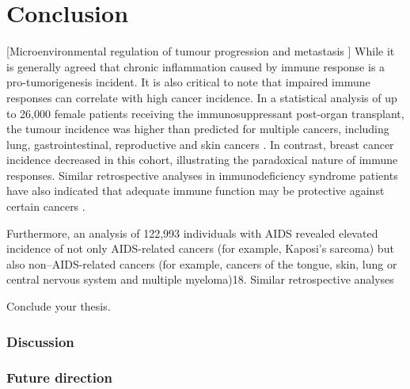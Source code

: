 \chapter[Conclusion]{Conclusion}
\label{Chap:Conclusion}
\pagestyle{headings}
[Microenvironmental regulation of tumour progression and metastasis ] 
While it is generally agreed that chronic inflammation caused by immune response is a pro-tumorigenesis incident. It is also critical to note that impaired immune responses can correlate with high cancer incidence. In a statistical analysis of up to 26,000 female patients receiving the immunosuppressant post-organ transplant, the tumour incidence was higher than predicted for multiple cancers, including lung, gastrointestinal, reproductive and skin cancers \cite{stewart1995incidence}. In contrast, breast cancer incidence decreased in this cohort, illustrating the paradoxical nature of immune responses.   Similar retrospective analyses in immunodeficiency syndrome patients have also indicated that adequate immune function may be protective against certain cancers \cite{quail2013microenvironmental}.  

Furthermore, an analysis of 122,993 individuals with AIDS revealed elevated incidence of not only AIDS-related cancers (for example, Kaposi's sarcoma) but also non–AIDS-related cancers (for example, cancers of the tongue, skin, lung or central nervous system and multiple myeloma)18. Similar retrospective analyses 


Conclude your thesis.
\subsection{Discussion}
\subsection{Future direction}
% 

% 